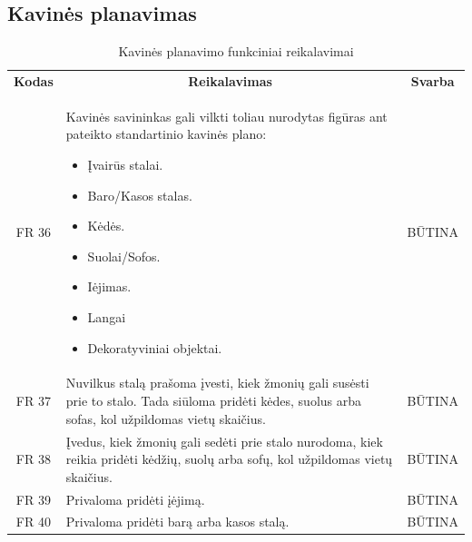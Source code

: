 \documentclass{VUMIFPSkursinis}
\begin{document}
\subsection{Kavinės planavimas}
\begin{center}
	\begin{table}[H]
	\caption{Kavinės planavimo funkciniai reikalavimai}
	\begin{tabular}{|p{2cm}|p{}|p{}|}
	
	\hline
	    \rowcolor{lightgray}
		\multicolumn{3}{|c|}{Kavinės planavimas}\\
		
	\hline
		\multicolumn{1}{|c|}{{\bfseries Kodas}}&
		\multicolumn{1}{|c|}{{\bfseries Reikalavimas}}&
		\multicolumn{1}{|c|}{{\bfseries Svarba}}\\

	\hline
		\multicolumn{1}{|c|}{FR 36}&
		{Kavinės savininkas gali vilkti toliau nurodytas figūras ant pateikto standartinio kavinės plano:
		\begin{itemize}
			\item Įvairūs stalai.
			\item Baro/Kasos stalas.
			\item Kėdės.
			\item Suolai/Sofos.
			\item Iėjimas.
			\item Langai
			\item Dekoratyviniai objektai.
		\end{itemize}}&
		\multicolumn{1}{|c|}{BŪTINA}\\

	\hline
	
		\multicolumn{1}{|c|}{FR 37}&
		{Nuvilkus stalą prašoma įvesti, kiek žmonių gali susėsti prie to stalo. Tada siūloma pridėti kėdes, suolus arba sofas, kol užpildomas vietų skaičius.}&
		\multicolumn{1}{|c|}{BŪTINA}\\				
	\hline
	
		\multicolumn{1}{|c|}{FR 38}&
		{Įvedus, kiek žmonių gali sedėti prie stalo nurodoma, kiek reikia pridėti kėdžių, suolų arba sofų, kol užpildomas vietų skaičius.}&
		\multicolumn{1}{|c|}{BŪTINA}\\				
	\hline
	
		\multicolumn{1}{|c|}{FR 39}&
		{Privaloma pridėti įėjimą.}&
		\multicolumn{1}{|c|}{BŪTINA}\\				
	\hline
	
		\multicolumn{1}{|c|}{FR 40}&
		{Privaloma pridėti barą arba kasos stalą.}&
		\multicolumn{1}{|c|}{BŪTINA}\\				
	\hline
	

\end{tabular}
\end{table}
\end{center}
\end{document}
